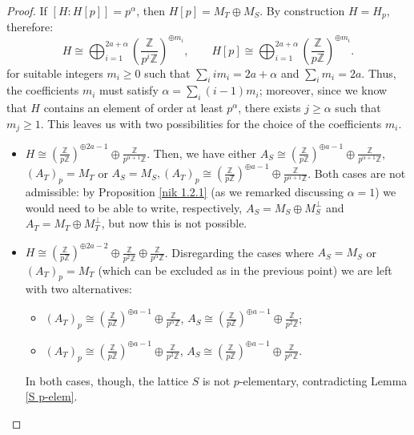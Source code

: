 \documentclass{amsart}
\theoremstyle{definition}
\newcommand{\IZ}{\mathbb{Z}}
\begin{document}
\begin{proof}
If $\left[ H : H[p]\right] = p^\alpha$, then $H[p] = M_T \oplus M_S$. By construction $H = H_p$, therefore:
\begin{equation}\label{general form of H}
H \cong \bigoplus_{i=1}^{2a + \alpha} \left( \frac{\IZ}{p^i \IZ}\right)^{\oplus m_i}, 	\qquad H[p] \cong \bigoplus_{i=1}^{2a + \alpha} \left( \frac{\IZ}{p \IZ}\right)^{\oplus m_i}.
\end{equation}
\noindent for suitable integers $m_i \geq 0$ such that $\sum_{i}im_i = 2a + \alpha$ and $\sum_{i} m_i = 2a$. Thus, the coefficients $m_i$ must satisfy $\alpha = \sum_{i}(i-1)m_i$; moreover, since we know that $H$ contains an element of order at least $p^\alpha$, there exists $j \geq \alpha$ such that $m_j \geq 1$. This leaves us with two possibilities for the choice of the coefficients $m_i$.
\begin{itemize}
\item $H \cong \left( \frac{\IZ}{p \IZ}\right)^{\oplus 2a-1} \oplus \frac{\IZ}{p^{\alpha+1} \IZ}$. Then, we have either $A_S \cong \left( \frac{\IZ}{p \IZ}\right)^{\oplus a-1} \oplus \frac{\IZ}{p^{\alpha+1} \IZ}$, \mbox{$\left(A_T\right)_p = M_T$} or $A_S = M_S, \left(A_T\right)_p \cong \left( \frac{\IZ}{p \IZ}\right)^{\oplus a-1} \oplus \frac{\IZ}{p^{\alpha+1} \IZ}$. Both cases are not admissible: by Proposition \ref{nik 1.2.1} (as we remarked discussing $\alpha = 1$) we would need to be able to write, respectively, $A_S = M_S \oplus M_S^\perp$ and $A_T = M_T \oplus M_T^\perp$, but now this is not possible.

\item $H \cong \left( \frac{\IZ}{p \IZ}\right)^{\oplus 2a-2} \oplus \frac{\IZ}{p^{2} \IZ} \oplus \frac{\IZ}{p^{\alpha} \IZ}$. Disregarding the cases where $A_S = M_S$ or $\left( A_T \right)_p = M_T$ (which can be excluded as in the previous point) we are left with two alternatives:
\begin{itemize}
\item $\left(A_T\right)_p \cong \left( \frac{\IZ}{p \IZ}\right)^{\oplus a-1} \oplus \frac{\IZ}{p^\alpha \IZ}$, $A_S \cong \left( \frac{\IZ}{p \IZ}\right)^{\oplus a-1}\oplus \frac{\IZ}{p^2 \IZ}$;
\item $\left(A_T\right)_p \cong \left( \frac{\IZ}{p \IZ}\right)^{\oplus a-1} \oplus \frac{\IZ}{p^2 \IZ}$, $A_S \cong \left( \frac{\IZ}{p \IZ}\right)^{\oplus a-1}\oplus \frac{\IZ}{p^\alpha \IZ}$.
\end{itemize}
In both cases, though, the lattice $S$ is not $p$-elementary, contradicting Lemma \ref{S p-elem}.
\end{itemize} 


\end{proof}
\end{document}
